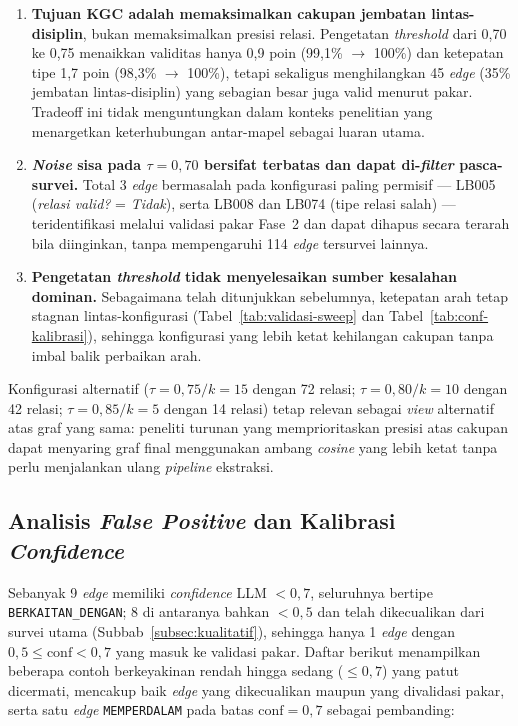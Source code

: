\documentclass[../../thesis]{subfiles}
\begin{document}
\begin{enumerate}
  \item \textbf{Tujuan KGC adalah memaksimalkan cakupan jembatan
    lintas-disiplin}, bukan memaksimalkan presisi relasi. Pengetatan
    \textit{threshold} dari 0{,}70 ke 0{,}75 menaikkan validitas hanya
    0{,}9 poin (99{,}1\% $\to$ 100\%) dan ketepatan tipe 1{,}7 poin
    (98{,}3\% $\to$ 100\%), tetapi sekaligus menghilangkan 45
    \textit{edge} (35\% jembatan lintas-disiplin) yang sebagian besar
    juga valid menurut pakar. Tradeoff ini tidak menguntungkan dalam
    konteks penelitian yang menargetkan keterhubungan antar-mapel
    sebagai luaran utama.

  \item \textbf{\textit{Noise} sisa pada $\tau=0{,}70$ bersifat terbatas
    dan dapat di-\textit{filter} pasca-survei.} Total 3 \textit{edge}
    bermasalah pada konfigurasi paling permisif --- LB005
    (\textit{relasi valid?} = \textit{Tidak}), serta LB008 dan LB074
    (tipe relasi salah) --- teridentifikasi melalui validasi pakar Fase~2
    dan dapat dihapus secara terarah bila diinginkan, tanpa mempengaruhi
    114 \textit{edge} tersurvei lainnya.

  \item \textbf{Pengetatan \textit{threshold} tidak menyelesaikan sumber
    kesalahan dominan.} Sebagaimana telah ditunjukkan sebelumnya, ketepatan
    arah tetap stagnan lintas-konfigurasi (Tabel~\ref{tab:validasi-sweep}
    dan Tabel~\ref{tab:conf-kalibrasi}), sehingga konfigurasi yang lebih
    ketat kehilangan cakupan tanpa imbal balik perbaikan arah.
\end{enumerate}

Konfigurasi alternatif ($\tau = 0{,}75 / k=15$ dengan 72 relasi;
$\tau = 0{,}80 / k=10$ dengan 42 relasi; $\tau = 0{,}85 / k=5$ dengan
14 relasi) tetap relevan sebagai \textit{view} alternatif atas graf
yang sama: peneliti turunan yang memprioritaskan presisi atas cakupan
dapat menyaring graf final menggunakan ambang \textit{cosine}
yang lebih ketat tanpa perlu menjalankan ulang \textit{pipeline}
ekstraksi.

\subsection{Analisis \textit{False Positive} dan Kalibrasi \textit{Confidence}}\label{subsubsec:false-positive}

Sebanyak 9 \textit{edge} memiliki \textit{confidence} LLM $< 0{,}7$,
seluruhnya bertipe \texttt{BERKAITAN\_DENGAN}; 8 di antaranya bahkan
$< 0{,}5$ dan telah dikecualikan dari survei utama
(Subbab~\ref{subsec:kualitatif}), sehingga hanya 1 \textit{edge} dengan
$0{,}5\!\le\!\text{conf}\!<\!0{,}7$ yang masuk ke validasi pakar. Daftar
berikut menampilkan beberapa contoh berkeyakinan rendah hingga sedang
($\leq 0{,}7$) yang patut dicermati, mencakup baik \textit{edge} yang
dikecualikan maupun yang divalidasi pakar, serta satu \textit{edge}
\texttt{MEMPERDALAM} pada batas $\text{conf}\!=\!0{,}7$ sebagai pembanding:
\end{document}
